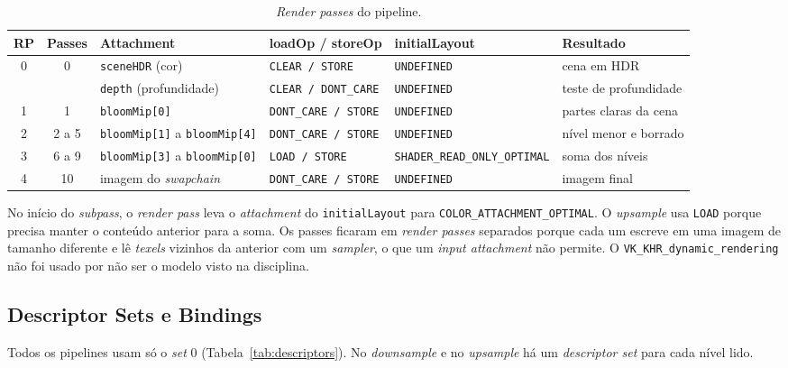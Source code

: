 \begin{table}[H]
    \centering
    \caption{\textit{Render passes} do pipeline.}
    \label{tab:renderpasses}
    \vspace{4pt}
    \scriptsize
    \setlength{\tabcolsep}{4pt}
    \begin{tabular}{c c l l l l}
        \toprule
        \textbf{RP} & \textbf{Passes} & \textbf{Attachment} & \textbf{loadOp / storeOp} & \textbf{initialLayout} & \textbf{Resultado} \\
        \midrule
        0 & 0 & \texttt{sceneHDR} (cor) & \texttt{CLEAR / STORE} & \texttt{UNDEFINED} & cena em HDR \\
          &   & \texttt{depth} (profundidade) & \texttt{CLEAR / DONT\_CARE} & \texttt{UNDEFINED} & teste de profundidade \\
        1 & 1 & \texttt{bloomMip[0]} & \texttt{DONT\_CARE / STORE} & \texttt{UNDEFINED} & partes claras da cena \\
        2 & 2 a 5 & \texttt{bloomMip[1]} a \texttt{bloomMip[4]} & \texttt{DONT\_CARE / STORE} & \texttt{UNDEFINED} & nível menor e borrado \\
        3 & 6 a 9 & \texttt{bloomMip[3]} a \texttt{bloomMip[0]} & \texttt{LOAD / STORE} & \texttt{SHADER\_READ\_ONLY\_OPTIMAL} & soma dos níveis \\
        4 & 10 & imagem do \textit{swapchain} & \texttt{DONT\_CARE / STORE} & \texttt{UNDEFINED} & imagem final \\
        \bottomrule
    \end{tabular}
\end{table}

No início do \textit{subpass}, o \textit{render pass} leva o \textit{attachment} do \texttt{initialLayout} para \texttt{COLOR\_ATTACHMENT\_OPTIMAL}. O \textit{upsample} usa \texttt{LOAD} porque precisa manter o conteúdo anterior para a soma. Os passes ficaram em \textit{render passes} separados porque cada um escreve em uma imagem de tamanho diferente e lê \textit{texels} vizinhos da anterior com um \textit{sampler}, o que um \textit{input attachment} não permite. O \texttt{VK\_KHR\_dynamic\_rendering} não foi usado por não ser o modelo visto na disciplina.

\subsection{Descriptor Sets e Bindings}
Todos os pipelines usam só o \textit{set} 0 (Tabela~\ref{tab:descriptors}). No \textit{downsample} e no \textit{upsample} há um \textit{descriptor set} para cada nível lido.

